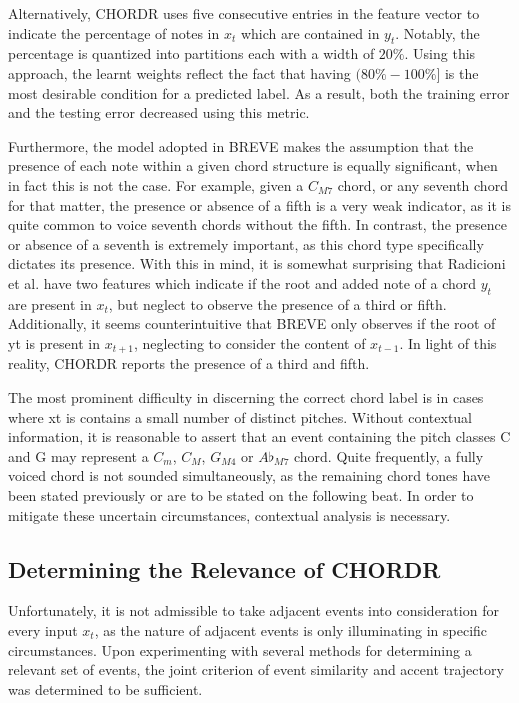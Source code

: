 \documentclass{article} %
\begin{document}
Alternatively, CHORDR uses five consecutive entries in the feature vector to indicate the percentage of notes in $x_t$ which are contained in $y_t$. Notably, the percentage is quantized into partitions each with a width of $20\%$. Using this approach, the learnt weights reflect the fact that having $(80\% - 100\%]$ is the most desirable condition for a predicted label. As a result, both the training error and the testing error decreased using this metric.

Furthermore, the model adopted in BREVE makes the assumption that the presence of each note within a given chord structure is equally significant, when in fact this is not the case. For example, given a $C_{M7}$ chord, or any seventh chord for that matter, the presence or absence of a fifth is a very weak indicator, as it is quite common to voice seventh chords without the fifth. In contrast, the presence or absence of a seventh is extremely important, as this chord type specifically dictates its presence. With this in mind, it is somewhat surprising that Radicioni et al. have two features which indicate if the root and added note of a chord $y_t$ are present in $x_t$, but neglect to observe the presence of a third or fifth. Additionally, it seems counterintuitive that BREVE only observes if the root of yt is present in $x_{t+1}$, neglecting to consider the content of $x_{t-1}$. In light of this reality, CHORDR reports the presence of a third and fifth.

The most prominent difficulty in discerning the correct chord label is in cases where xt is contains a small number of distinct pitches. Without contextual information, it is reasonable to assert that an event containing the pitch classes C and G may represent a $C_{m}$, $C_{M}$, $G_{M4}$ or $A\flat_{M7}$ chord. Quite frequently, a fully voiced chord is not sounded simultaneously, as the remaining chord tones have been stated previously or are to be stated on the following beat. In order to mitigate these uncertain circumstances, contextual analysis is necessary.

\subsection{Determining the Relevance of CHORDR}

Unfortunately, it is not admissible to take adjacent events into consideration for every input $x_t$, as the nature of adjacent events is only illuminating in specific circumstances. Upon experimenting with several methods for determining a relevant set of events, the joint criterion of event similarity and accent trajectory was determined to be sufficient.
\end{document}
